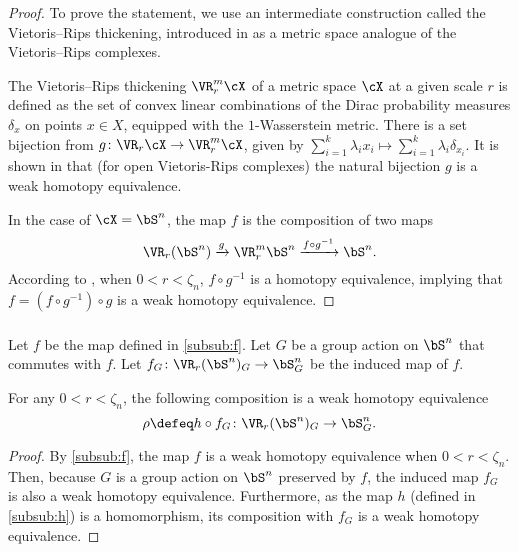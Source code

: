 \begin{proof}
	To prove the statement, we use an intermediate construction called the Vietoris--Rips thickening, introduced in \cite{adamaszek2018metric} as a metric space analogue of the Vietoris--Rips complexes.

	The Vietoris--Rips thickening $\VR_r^m\cX$ of a metric space $\cX$ at a given scale $r$ is defined as the set of convex linear combinations of the Dirac probability measures $\delta_{x}$ on points $x \in X$, equipped with the $1$-Wasserstein metric.
	There is a set bijection from $g \colon \VR_r\cX \to \VR_r^m\cX$, given by $\sum_{i=1}^k\lambda_i x_i\mapsto \sum_{i=1}^k\lambda_i\delta_{x_i}.$
	It is shown in \cite[Theorem 1]{gillespie2024vietoris} that (for open Vietoris-Rips complexes) the natural bijection $g$ is a weak homotopy equivalence.

	In the case of $\cX = \bS^n$, the map $f$ is the composition of two maps
	\[\VR_r(\bS^n)\xrightarrow{g}\VR_r^m\bS^n\xrightarrow{f \circ g^{-1}}\bS^n.\]
	According to \cite[Proposition 5.3]{adamaszek2018metric}, when $0<r<\zeta_n$, $f \circ g^{-1}$ is a homotopy equivalence, implying that $f = (f \circ g^{-1}) \circ g$ is a weak homotopy equivalence.
\end{proof}

\subsubsection{}
\label{subsub:rho}
Let $f$ be the map defined in \cref{subsub:f}.
Let $G$ be a group action on $\bS^n$ that commutes with $f$.
Let $f_G \colon \VR_r(\bS^n)_G \to \bS^n_G$ be the induced map of $f$.

\medskip\lemma
For any $0<r<\zeta_n$, the following composition is a weak homotopy equivalence
\[
\rho \defeq h \circ f_G
\colon \VR_r(\bS^n)_G \to \bS^n_G.
\]
\begin{proof}
	By \cref{subsub:f}, the map $f$ is a weak homotopy equivalence when $0<r<\zeta_n$.
	Then, because $G$ is a group action on $\bS^n$ preserved by $f$, the induced map $f_G$ is also a weak homotopy equivalence.
	Furthermore, as the map $h$ (defined in \cref{subsub:h}) is a homomorphism, its composition with $f_G$ is a weak homotopy equivalence.
\end{proof}

\subsubsection{}

